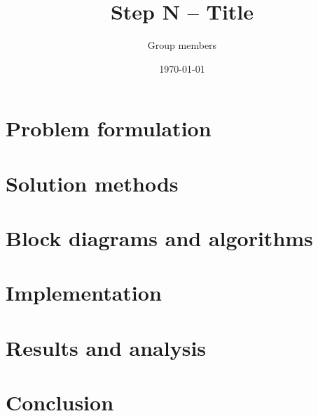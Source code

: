 \documentclass[11pt,a4paper]{article}
\title{Step N -- Title}
\author{Group members}
\date{\today}
\begin{document}
\maketitle

\section{Problem formulation}
\section{Solution methods}
\section{Block diagrams and algorithms}
\section{Implementation}
\section{Results and analysis}
\section{Conclusion}



\end{document}
